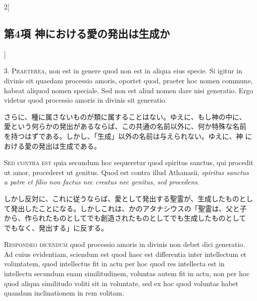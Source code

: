 \documentclass[paper=a4paper,fontsize=10pt,jafontsize=9pt,titlepage]{jlreq}
\begin{document}
\begin{paracol}{2}[\subsection{第4項 神における愛の発出は生成か}]


3. {\scshape Praeterea}, non est in genere quod non est in aliqua eius
 specie. Si igitur in divinis sit quaedam processio amoris, oportet
 quod, praeter hoc nomen commune, habeat aliquod nomen speciale. Sed non
 est aliud nomen dare nisi generatio. Ergo videtur quod processio amoris
 in divinis sit generatio.


\switchcolumn


さらに、種に属さないものが類に属することはない。ゆえに、もし神の中に、
 愛という何らかの発出があるならば、この共通の名前以外に、何か特殊な名前
 を持つはずである。しかし、「生成」以外の名前は与えられない。ゆえに、神
 における愛の発出は生成である。


\switchcolumn*[\subsection{s.c.}]


{\scshape Sed contra est} quia secundum hoc sequeretur quod spiritus
 sanctus, qui procedit ut amor, procederet ut genitus. Quod est contra
 illud Athanasii, {\itshape spiritus sanctus a patre et filio non factus nec
 creatus nec genitus, sed procedens}.


\switchcolumn


しかし反対に、これに従うならば、愛として発出する聖霊が、生成したものとし
 て発出したことになる。しかしこれは、かのアタナシウスの「聖霊は、父と子
 から、作られたものとしてでも創造されたものとしてでも生成したものとして
 でもなく、発出する」に反する。




{\scshape Respondeo dicendum} quod processio amoris in divinis non debet dici
 generatio. Ad cuius evidentiam, sciendum est quod haec est differentia
 inter intellectum et voluntatem, quod intellectus fit in actu per hoc
 quod res intellecta est in intellectu secundum suam similitudinem,
 voluntas autem fit in actu, non per hoc quod aliqua similitudo voliti
 sit in voluntate, sed ex hoc quod voluntas habet quandam inclinationem
 in rem volitam.


\switchcolumn



\end{paracol}
\end{document}
